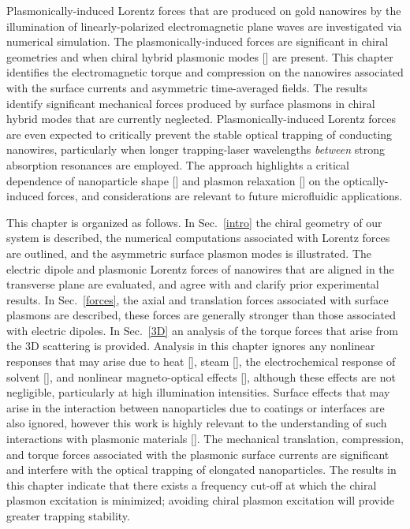 Plasmonically-induced Lorentz forces that are produced on gold nanowires by the illumination of linearly-polarized electromagnetic plane waves are investigated via numerical simulation.  The plasmonically-induced forces are significant in chiral geometries and when chiral hybrid plasmonic modes [\cite{Zhang2011}] are present.  This chapter identifies the electromagnetic torque and compression on the nanowires associated with the surface currents and asymmetric time-averaged fields. The results identify significant mechanical forces produced by surface plasmons in chiral hybrid modes that are currently neglected. Plasmonically-induced Lorentz forces are even expected to critically prevent the stable optical trapping of conducting nanowires, particularly when longer trapping-laser wavelengths {\it between} strong absorption resonances are employed. The approach highlights a critical dependence of nanoparticle shape [\cite{Knight2007, Tong}] and plasmon relaxation [\cite{Yan2013}] on the optically-induced forces, and considerations are relevant to future microfluidic applications.

This chapter is organized as follows. In Sec.~\ref{intro} the chiral geometry of our system is described, the numerical computations associated with Lorentz forces are outlined, and the asymmetric surface plasmon modes is illustrated. The electric dipole and plasmonic Lorentz forces of nanowires that are aligned in the transverse plane are evaluated, and agree with and clarify prior experimental results. In Sec.~\ref{forces}, the axial and translation forces associated with surface plasmons are described, these forces are generally stronger than those associated with electric dipoles.  In Sec.~\ref{3D} an analysis of the torque forces that arise from the 3D scattering is provided.  Analysis in this chapter ignores any nonlinear responses that may arise due to heat [\cite{Shvedov2010}], steam [\cite{Saija2009, Fang2013}], the electrochemical response of solvent [\cite{Arcenegui2013}], and nonlinear magneto-optical effects [\cite{Singh, Moocarme2014}], although these effects are not negligible, particularly at high illumination intensities.  Surface effects that may arise in the interaction between nanoparticles due to coatings or interfaces are also ignored, however this work is highly relevant to the understanding of such interactions with plasmonic materials [\cite{Bonin}].  The mechanical translation, compression, and torque forces associated with the plasmonic surface currents are significant and interfere with the optical trapping of elongated nanoparticles. The results in this chapter indicate that there exists a frequency cut-off at which the chiral plasmon excitation is minimized; avoiding chiral plasmon excitation will provide greater trapping stability.

